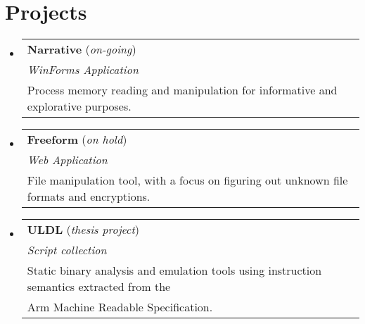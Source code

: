 \documentclass[12pt, a4paper]{article}
\begin{document}
  \vspace{-10pt}\section*{Projects}
  \begin{itemize}[leftmargin=*]
    \vspace{-1pt}\item[]
    \begin{tabular*}{0.98\textwidth}{l}
      \hspace{-10pt}\textbf{Narrative} (\textit{\small on-going}) \\
      \hspace{-10pt}\textit{\small WinForms Application} \\
      \small{Process memory reading and manipulation for informative and explorative purposes.} \\
    \end{tabular*}\vspace{-5pt}

    \vspace{-1pt}\item[]
    \begin{tabular*}{0.98\textwidth}{l}
      \hspace{-10pt}\textbf{Freeform} (\textit{\small on hold}) \\
      \hspace{-10pt}\textit{\small Web Application} \\
      \small{File manipulation tool, with a focus on figuring out unknown file formats and encryptions.} \\
    \end{tabular*}\vspace{-5pt}
    
    \vspace{-1pt}\item[]
    \begin{tabular*}{0.98\textwidth}{l}
      \hspace{-10pt}\textbf{ULDL} (\textit{\small thesis project}) \\
      \hspace{-10pt}\textit{\small Script collection} \\
      \small{Static binary analysis and emulation tools using instruction semantics extracted from the}\\
      \small{Arm Machine Readable Specification.} \\
    \end{tabular*}\vspace{-5pt}
  \end{itemize}
\end{document}
